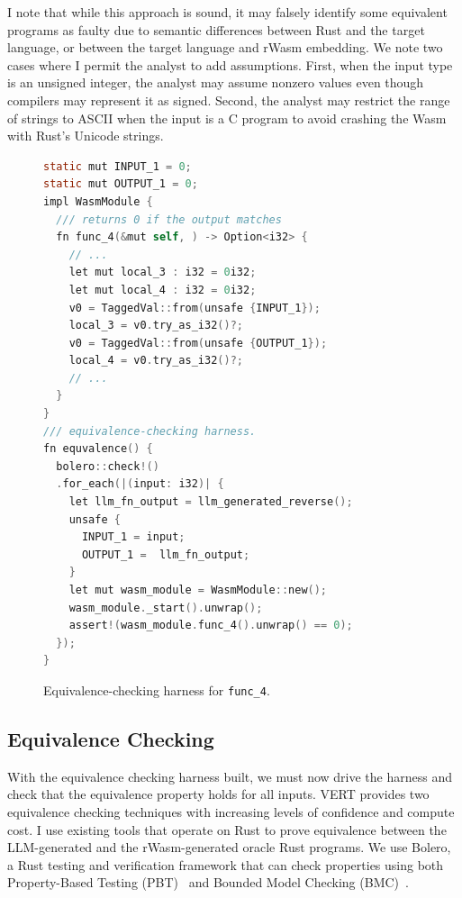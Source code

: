 \documentclass[12pt,openany,oneside,table]{cmuthesis}
\begin{document}
I note that while this approach is sound, it may falsely identify
some equivalent programs as faulty due to semantic differences between
Rust and the target language, or between the target language and
rWasm{} embedding. We note two cases where I permit the analyst to
add assumptions. First, when the input type is an unsigned integer,
the analyst may assume nonzero values even though compilers may
represent it as signed. Second, the analyst may restrict the range of
strings to ASCII when the input is a C program to avoid crashing the
Wasm with Rust's Unicode strings.

\begin{figure}
\centering
\begin{lstlisting}[numbersep=5pt,xleftmargin=21pt,numberstyle=\scriptsize,basicstyle=\footnotesize\ttfamily,firstnumber=1, language=C]
static mut INPUT_1 = 0;
static mut OUTPUT_1 = 0;
impl WasmModule {
  /// returns 0 if the output matches
  fn func_4(&mut self, ) -> Option<i32> {
    // ...
    let mut local_3 : i32 = 0i32;
    let mut local_4 : i32 = 0i32;
    v0 = TaggedVal::from(unsafe {INPUT_1});
    local_3 = v0.try_as_i32()?;
    v0 = TaggedVal::from(unsafe {OUTPUT_1});
    local_4 = v0.try_as_i32()?;
    // ...
  }
}
/// equivalence-checking harness.
fn equvalence() {
  bolero::check!()
  .for_each(|(input: i32)| {
    let llm_fn_output = llm_generated_reverse();
    unsafe {
      INPUT_1 = input;
      OUTPUT_1 =  llm_fn_output;
    }
    let mut wasm_module = WasmModule::new();
    wasm_module._start().unwrap();
    assert!(wasm_module.func_4().unwrap() == 0);
  });
}
\end{lstlisting}
\caption{\small Equivalence-checking harness for {\tt func\_4}.}
\label{code:eqharness}
\vspace*{-5mm}
\end{figure}

\subsection{Equivalence Checking}

With the equivalence checking harness built, we must now drive the harness and check that the equivalence property holds for all inputs. VERT provides two equivalence checking techniques with increasing levels of confidence and compute cost.
I use existing tools that operate on Rust to
prove equivalence between the LLM-generated and the rWasm-generated oracle Rust programs. We use Bolero, a Rust testing and verification framework that can check properties using both Property-Based Testing (PBT)~\cite{fink1997property} and Bounded Model Checking (BMC)~\cite{clarke2001bounded,DBLP:conf/tacas/ClarkeKL04}.
\end{document}
